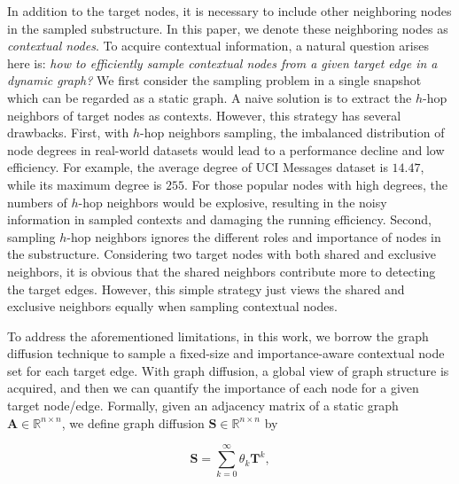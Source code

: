 \documentclass[10pt,journal,compsoc]{IEEEtran}
\newcommand{\HL}{}
\newcommand{\yg}{}
\begin{document}
\HL{In addition to} the target nodes, it is necessary to include other neighboring nodes in the sampled substructure. In this paper, we denote these neighboring nodes as \textit{contextual nodes}. To acquire contextual information, a natural question arises here is: \textit{how to efficiently sample contextual nodes from a given target edge in a dynamic graph?} We first consider the sampling problem in a single \HL{snapshot} which can be regarded as a static graph. A naive solution is to extract the $h$-hop neighbors of target nodes as contexts. However, this strategy has several drawbacks. First, with $h$-hop neighbors sampling, the \HL{imbalanced} distribution of node degrees in real-world datasets would lead to a performance decline and low efficiency. For example, the average degree of UCI Messages dataset is $14.47$, while its maximum degree is $255$. 
\HL{For those popular nodes with high degrees, the numbers of $h$-hop neighbors would be explosive, resulting in the noisy information in sampled contexts and damaging the running efficiency.} 
Second, sampling $h$-hop neighbors ignores the different roles and importance of nodes in the substructure. Considering two target nodes with both shared and exclusive neighbors, it is obvious that the shared neighbors contribute more to detecting the target edges. However, \HL{this} simple strategy just views the shared and exclusive neighbors equally when sampling contextual nodes.

To address the aforementioned limitations, in this work, we borrow the graph diffusion technique \cite{klicpera2019diffusion,hassani2020contrastive} to sample a \HL{fixed-size} and importance-aware contextual node set for each target edge. With graph diffusion, a global view of graph structure is acquired, and then we can quantify the importance of each node for a given target node/edge. Formally, given an adjacency matrix of a static graph $\mathbf{A} \in \mathbb{R}^{n \times n}$, \yg{we define graph diffusion $\mathbf{S} \in \mathbb{R}^{n \times n}$ by}

\begin{equation}
\label{eq:diffusion}
\mathbf{S}=\sum_{k=0}^{\infty} \theta_{k} \mathbf{T}^{k},
\end{equation}
\end{document}
